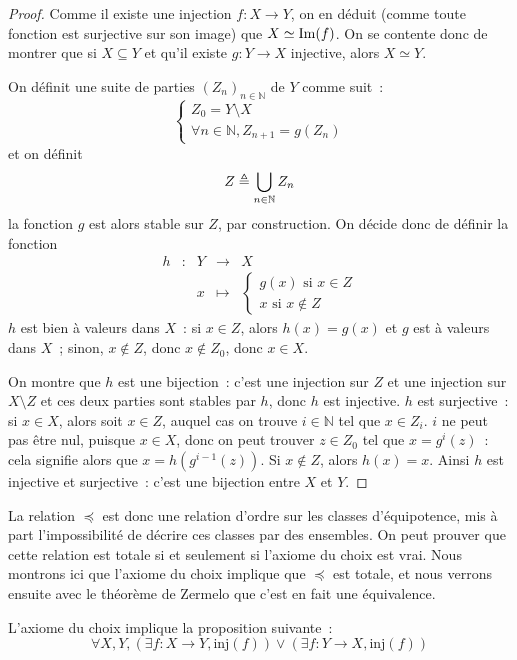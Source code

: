 \begin{proof}
  Comme il existe une injection $f : X \to Y$, on en déduit (comme toute
  fonction est surjective sur son image) que $X \simeq \operatorname{Im}(f)$. On se contente
  donc de montrer que si $X \subseteq Y$ et qu'il existe $g : Y \to X$
  injective, alors $X \simeq Y$.

  On définit une suite de parties $(Z_n)_{n\in\mathbb N}$ de $Y$ comme suit~:
  \[\left\{\begin{array}{l}
  Z_0 = Y \setminus X\\
  \forall n \in \mathbb N, Z_{n+1} = g(Z_n)
  \end{array}\right.\]
  et on définit
  \[Z \triangleq \bigcup_{n \in \mathbb N} Z_n\]
  la fonction $g$ est alors stable sur $Z$, par construction. On décide donc de
  définir la fonction
  \[\begin{array}{ccccc}
  h & : & Y & \rightarrow & X \\
  & & x & \longmapsto & \left\{
  \begin{array}{l}
    g(x) \text{ si } x \in Z\\
    x \text{ si } x \notin Z
  \end{array}\right.
  \end{array}\]
  $h$ est bien à valeurs dans $X$~: si $x \in Z$, alors $h(x) = g(x)$ et
  $g$ est à valeurs dans $X$~; sinon, $x \notin Z$, donc $x\notin Z_0$, donc
  $x \in X$.

  On montre que $h$ est une bijection~: c'est une injection sur $Z$ et une
  injection sur $X\setminus Z$ et ces deux parties sont stables par $h$, donc
  $h$ est injective. $h$ est surjective~: si $x \in X$, alors soit $x \in Z$,
  auquel cas on trouve $i \in \mathbb N$ tel que $x \in Z_i$. $i$ ne peut
  pas être nul, puisque $x \in X$, donc on peut trouver $z \in Z_0$ tel que
  $x = g^i(z)$~: cela signifie alors que $x = h(g^{i-1}(z))$. Si $x \notin Z$,
  alors $h(x) = x$. Ainsi $h$ est injective et surjective~: c'est une bijection
  entre $X$ et $Y$.
\end{proof}

La relation $\preceq$ est donc une relation d'ordre sur les classes
d'équipotence, mis à part l'impossibilité de décrire ces classes par des
ensembles. On peut prouver que cette relation est totale si et seulement si
l'axiome du choix est vrai. Nous montrons ici que l'axiome du choix implique
que $\preceq$ est totale, et nous verrons ensuite avec le théorème de Zermelo
que c'est en fait une équivalence.

\begin{property}
  L'axiome du choix implique la proposition suivante~:
  \[\forall X,Y,(\exists f : X \to Y, \mathrm{inj}(f))\lor(\exists f : Y \to X,
  \mathrm{inj}(f))\]
\end{property}


